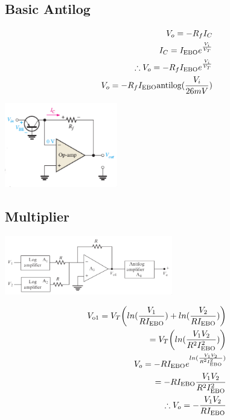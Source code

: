 \documentclass[a4paper, 12pt]{report}
\begin{document}
\begin{center}
\begin{center}
\begin{center}
\begin{center}
\begin{center}
\begin{center}
\begin{center}
\begin{center}
\begin{center}
\begin{center}
\begin{center}
\begin{center}
\subsection{Basic Antilog}
\begin{multicols}{2}
    \begin{equation}\notag
        \begin{align}
            V_o = -R_fI_C \\
            I_C = I_\text{EBO}e^{\frac{V_i}{V_T}}\\
            \therefore V_o = -R_fI_\text{EBO}e^{\frac{V_i}{V_T}}\\
            V_o = -R_f I_\text{EBO} \text{antilog}(\frac{V_i}{26mV})
        \end{align}
    \end{equation}
\begin{center}
    \includegraphics[width=0.37\textwidth]{figures/28c.png}
\end{center}
\end{multicols}

\begin{multicols}{2}
\section{Multiplier}
\begin{center}
    \includegraphics[width=0.55\textwidth]{figures/29c.png}
\end{center}
\begin{equation} \notag
    \begin{align}
        V_\text{o1} = V_T\bigg(ln(\frac{V_1}{RI_\text{EBO}}) + ln(\frac{V_2}{RI_\text{EBO}})\bigg)\\
        = V_T\bigg(ln(\frac{V_1V_2}{R^2I^2_\text{EBO}})\bigg)\\
        V_o = -R I_\text{EBO} e^{ln(\frac{V_1V_2}{R^2I^2_\text{EBO}})}\\
        = -R I_\text{EBO} \frac{V_1V_2}{R^2I^2_\text{EBO}}\\
        \therefore V_o = - \frac{V_1V_2}{RI_\text{EBO}}\\
    \end{align}
\end{equation}


\end{multicols}
\end{center}
\end{center}
\end{center}
\end{center}
\end{center}
\end{center}
\end{center}
\end{center}
\end{center}
\end{center}
\end{center}
\end{center}
\end{document}
